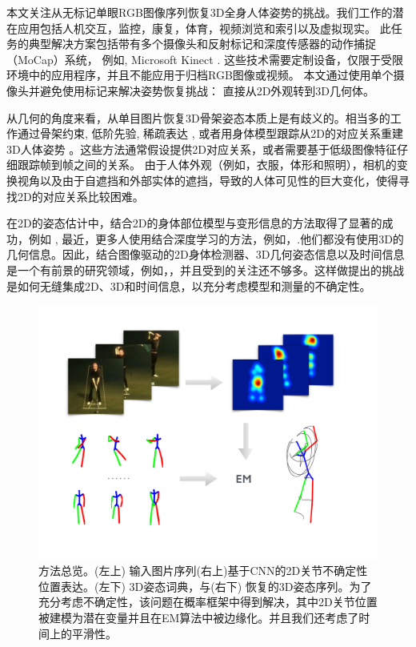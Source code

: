 
本文关注从无标记单眼RGB图像序列恢复3D全身人体姿势的挑战。我们工作的潜在应用包括人机交互，监控，康复，体育，视频浏览和索引以及虚拟现实。
此任务的典型解决方案包括带有多个摄像头和反射标记和深度传感器的动作捕捉（MoCap）系统， 例如, Microsoft Kinect \cite{kinect}. 这些技术需要定制设备，仅限于受限环境中的应用程序，并且不能应用于归档RGB图像或视频。 本文通过使用单个摄像头并避免使用标记来解决姿势恢复挑战：
直接从2D外观转到3D几何体。
 

从几何的角度来看，从单目图片恢复3D骨架姿态本质上是有歧义的\cite{lee1985determination}。相当多的工作通过骨架约束\cite{taylor2000reconstruction}, 低阶先验\cite{bregler2000recovering}, 稀疏表达 \cite{ramakrishna2012reconstructing}, 或者用身体模型跟踪从2D的对应关系重建3D人体姿势 \cite{bregler1998tracking}。这些方法通常假设提供2D对应关系，或者需要基于低级图像特征仔细跟踪帧到帧之间的关系。 由于人体外观（例如，衣服，体形和照明），相机的变换视角以及由于自遮挡和外部实体的遮挡，导致的人体可见性的巨大变化，使得寻找2D的对应关系比较困难。

在2D的姿态估计中，结合2D的身体部位模型与变形信息的方法取得了显著的成功，例如 \cite{yang2011articulated,andriluka20142d,nie2015joint}, 最近，更多人使用结合深度学习的方法，例如，\cite{toshev2014deep}.他们都没有使用3D的几何信息。因此，结合图像驱动的2D身体检测器、3D几何姿态信息以及时间信息是一个有前景的研究领域，例如，\cite{andriluka2010monocular,zhou2014spatio}，并且受到的关注还不够多。这样做提出的挑战是如何无缝集成2D、3D和时间信息，以充分考虑模型和测量的不确定性。

\begin{figure}[t]
   \includegraphics[width=\linewidth]{figures/overview.pdf}
   \caption{方法总览。(左上) 输入图片序列(右上)基于CNN的2D关节不确定性位置表达。(左下) 3D姿态词典，与(右下) 恢复的3D姿态序列。为了充分考虑不确定性，该问题在概率框架中得到解决，其中2D关节位置被建模为潜在变量并且在EM算法中被边缘化。并且我们还考虑了时间上的平滑性。}
   \label{fig:overview}
   \vspace{-1em}
\end{figure}


